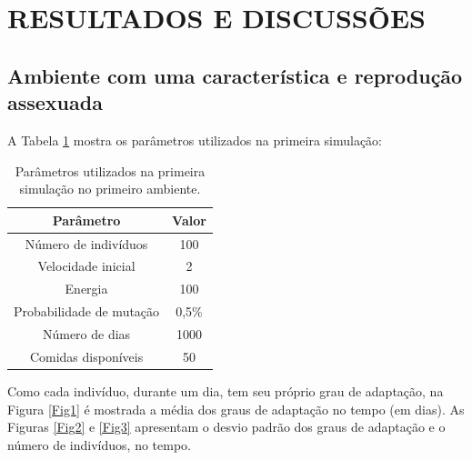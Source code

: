 \documentclass[10pt,brazil,english]{article}
\begin{document}
    \section{\uppercase{Resultados e Discussões}}
    
        \subsection{Ambiente com uma característica e reprodução assexuada}
        
            A Tabela \ref{Tab1} mostra os parâmetros utilizados na primeira simulação:
            
            \begin{table}[!hbtp]
                \centering
                \caption{Parâmetros utilizados na primeira simulação no primeiro ambiente.}
                \label{Tab1}
                \begin{tabular}{c|c}
                    \hline
                    \textbf{Parâmetro}          & \textbf{Valor}    \\ \hline
                    Número de indivíduos        & 100               \\ \hline
                    Velocidade inicial          & 2                 \\ \hline
                    Energia                     & 100               \\ \hline
                    Probabilidade de mutação    & 0,5\%             \\ \hline
                    Número de dias              & 1000              \\ \hline
                    Comidas disponíveis         & 50                \\ \hline
                \end{tabular}
            \end{table}
            
            Como cada indivíduo, durante um dia, tem seu próprio grau de adaptação, na Figura \ref{Fig1} é mostrada a média dos graus de adaptação no tempo (em dias). As Figuras \ref{Fig2} e \ref{Fig3} apresentam o desvio padrão dos graus de adaptação e o número de indivíduos, no tempo.
            
\end{document}
